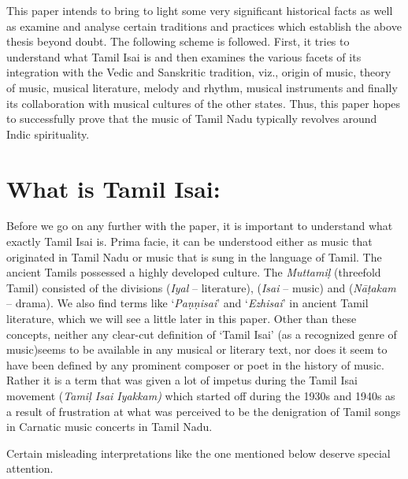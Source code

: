 This paper intends to bring to light some very significant historical facts as well as examine and analyse certain traditions and practices which establish the above thesis beyond doubt. The following scheme is followed. First, it tries to understand what Tamil Isai is and then examines the various facets of its integration with the Vedic and Sanskritic tradition, viz., origin of music, theory of music, musical literature, melody and rhythm, musical instruments and finally its collaboration with musical cultures of the other states. Thus, this paper hopes to successfully prove that the music of Tamil Nadu typically revolves around Indic spirituality.


\section*{What is Tamil Isai:}

Before we go on any further with the paper, it is important to understand what exactly Tamil Isai is. Prima facie, it can be understood either as music that originated in Tamil Nadu or music that is sung in the language of Tamil. The ancient Tamils possessed a highly developed culture. The \textit{Muttamiḷ} (threefold Tamil) consisted of the divisions (\textit{Iyal} – literature), (\textit{Isai} – music) and  (\textit{Nāṭakam} – drama). We also find terms like ‘\textit{Paṇṇisai}’ and ‘\textit{Ezhisai}’ in ancient Tamil literature, which we will see a little later in this paper. Other than these concepts, neither any clear-cut definition of ‘Tamil Isai’ (as a recognized genre of music)seems to be available in any musical or literary text, nor does it seem to have been defined by any prominent composer or poet in the history of music. Rather it is a term that was given a lot of impetus during the Tamil Isai movement (\textit{Tamiḷ Isai Iyakkam)} which started off during the 1930s and 1940s as a result of frustration at what was perceived to be the denigration of Tamil songs in Carnatic music concerts in Tamil Nadu.

\vskip 4pt

Certain misleading interpretations like the one mentioned below deserve special attention.

